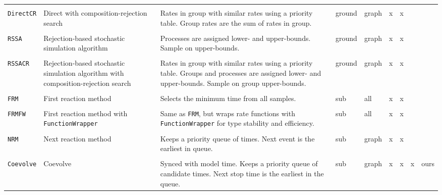\documentclass{juliacon}
\numberwithin{equation}{section}
\begin{document}
\begin{table}
\begin{tabular}{lL{3.3cm}L{3.9cm}llllll}
& & & & & & & & \\

\texttt{DirectCR}
  & Direct with composition-rejection search
  & Rates in group with similar rates using a priority table. Group rates are the sum of rates in group.
  & ground
  & graph
  & x
  & x
  &
  & \cite{slepoy2008}
  \\

& & & & & & & & \\


\texttt{RSSA}
  & Rejection-based stochastic simulation algorithm
  & Processes are assigned lower- and upper-bounds. Sample on upper-bounds.
  & ground
  & graph
  & x
  & x
  &
  & \cite{thanh2014}
  \\

& & & & & & & & \\

\texttt{RSSACR}
  & Rejection-based stochastic simulation algorithm with composition-rejection search
  & Rates in group with similar rates using a priority table. Groups and processes are assigned lower- and upper-bounds. Sample on group upper-bounds. 
  & ground
  & graph
  & x
  & x
  &
  & \cite{thanh2017}
  \\

& & & & & & & & \\

\texttt{FRM}
  & First reaction method
  & Selects the minimum time from all samples.
  & sub
  & all
  & x
  & x
  &
  & \cite{gillespie1976}
  \\

& & & & & & & & \\

\texttt{FRMFW}
  & First reaction method with \texttt{FunctionWrapper}
  & Same as \texttt{FRM}, but wraps rate functions with \texttt{FunctionWrapper} for type stability and efficiency.
  & sub
  & all
  & x
  & x
  &
  & \cite{gillespie1976}
  \\

& & & & & & & & \\

\texttt{NRM}
  & Next reaction method
  & Keeps a priority queue of times. Next event is the earliest in queue.
  & sub
  & graph
  & x
  & x
  &
  & \cite{gibson2000}
  \\

& & & & & & & & \\

\texttt{Coevolve}
  & Coevolve
  & Synced with model time. Keeps a priority queue of candidate times. Next stop time is the earliest in the queue.
  & sub
  & graph
  & x
  & x
  & x
  & ours
  \\


\end{tabular}
\end{table}
\end{document}
